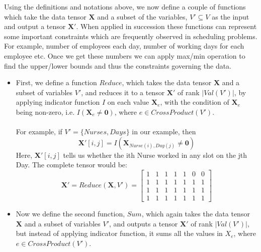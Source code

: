 \documentclass{article}
\begin{document}
Using the definitions and notations above, we now define a couple of functions which take the data tensor $\textbf{X}$ and a subset of the variables, $V' \subseteq V$ as the input and output a tensor $\textbf{X}'$. When applied in succession these functions can represent some important constraints which are frequently observed in scheduling problems. For example, number of employees each day, number of working days for each employee etc. Once we get these numbers we can apply max/min operation to find the upper/lower bounds and thus the constraints governing the data.
\begin{itemize}
\item First, we define a function $Reduce$, which takes the data tensor $\textbf{X}$ and a subset of variables $V'$, and reduces it to a tensor $\textbf{X}'$ of rank $|Val(V')|$, by applying indicator function $I$ on each value $\textbf{X}_e$, with the condition of $\textbf{X}_e$ being non-zero, i.e. $I(\textbf{X}_e \ne \textbf{0})$, where $e \in CrossProduct(V')$. \\
\\
For example, if $V' = \{Nurses, Days\}$ in our example, then
\[
\textbf{X}'[i,j] = I(\textbf{X}_{Nurse(i), Day(j)} \ne \textbf{0})
\]
Here, $\textbf{X}'[i,j]$ tells us whether the ith Nurse worked in any slot on the jth Day. The complete tensor would be:
\begin{equation}
\textbf{X}'
=
Reduce(\textbf{X}, V')
=
\begin{bmatrix}
    1 & 1 & 1 & 1 & 1 & 0 & 0 \\
    1 & 1 & 1 & 1 & 1 & 1 & 1 \\
    1 & 1 & 1 & 1 & 1 & 1 & 1 \\
    1 & 1 & 1 & 1 & 1 & 1 & 1 
\end{bmatrix}
\end{equation}
\item Now we define the second function, $Sum$, which again takes the data tensor $\textbf{X}$ and a subset of variables $V'$, and outputs a tensor $\textbf{X}'$ of rank $|Val(V')|$, but instead of applying indicator function, it sums all the values in $X_e$, where $e \in CrossProduct(V')$. 

\end{itemize}
\end{document}
